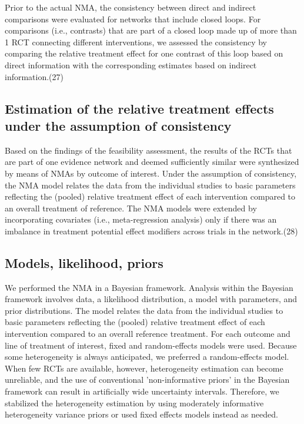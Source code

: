 \documentclass[11pt,final,fleqn]{article}\usepackage[]{graphicx}\usepackage[]{color}
\theoremstyle{plain}
\begin{document}
{\begin{appendices}
Prior to the actual NMA, the consistency between direct and indirect comparisons were evaluated for networks that include closed loops. For comparisons (i.e., contrasts) that are part of a closed loop made up of more than 1 RCT connecting different interventions, we assessed the consistency by comparing the relative treatment effect for one contrast of this loop based on direct information with the corresponding estimates based on indirect information.(27)  

\subsection{Estimation of the relative treatment effects under the assumption of consistency}

Based on the findings of the feasibility assessment, the results of the RCTs that are part of one evidence network and deemed sufficiently similar were synthesized by means of NMAs by outcome of interest. Under the assumption of consistency, the NMA model relates the data from the individual studies to basic parameters reflecting the (pooled) relative treatment effect of each intervention compared to an overall treatment of reference. The NMA models were extended by incorporating covariates (i.e., meta-regression analysis) only if there was an imbalance in treatment potential effect modifiers across trials in the network.(28)

\subsection{Models, likelihood, priors}

We performed the NMA in a Bayesian framework.  Analysis within the Bayesian framework involves data, a likelihood distribution, a model with parameters, and prior distributions.  The model relates the data from the individual studies to basic parameters reflecting the (pooled) relative treatment effect of each intervention compared to an overall reference treatment.  For each outcome and line of treatment of interest, fixed and random-effects models were used.  Because some heterogeneity is always anticipated, we preferred a random-effects model.  When few RCTs are available, however, heterogeneity estimation can become unreliable, and the use of conventional 'non-informative priors' in the Bayesian framework can result in artificially wide uncertainty intervals.  Therefore, we stabilized the heterogeneity estimation by using moderately informative heterogeneity variance priors or used fixed effects models instead as needed.


\end{appendices}}
\end{document}
